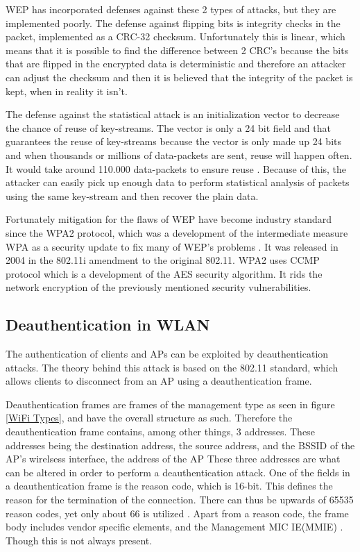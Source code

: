 WEP has incorporated defenses against these 2 types of attacks, but they are implemented poorly. The defense against flipping bits is integrity checks in the packet, implemented as a CRC-32 checksum. Unfortunately this is linear, which means that it is possible to find the difference between 2 CRC's because the bits that are flipped in the encrypted data is deterministic and therefore an attacker can adjust the checksum and then it is believed that the integrity of the packet is kept, when in reality it isn't.

The defense against the statistical attack is an initialization vector to decrease the chance of reuse of key-streams. The vector is only a 24 bit field and that guarantees the reuse of key-streams because the vector is only made up 24 bits and when thousands or millions of data-packets are sent, reuse will happen often. It would take around 110.000 data-packets to ensure reuse \cite{Random_map}. Because of this, the attacker can easily pick up enough data to perform statistical analysis of packets using the same key-stream and then recover the plain data.

Fortunately mitigation for the flaws of WEP have become industry standard since the WPA2 protocol, which was a development of the intermediate measure WPA as a security update to fix many of WEP's problems \cite{WPA2_1}\cite{WEP3}. It was released in 2004 in the 802.11i amendment to the original 802.11. WPA2 uses CCMP protocol which is a development of the AES security algorithm. It rids the network encryption of the previously mentioned security vulnerabilities. 

\subsection{Deauthentication in WLAN}
The authentication of clients and APs can be exploited by deauthentication attacks. The theory behind this attack is based on the 802.11 standard, which allows clients to disconnect from an AP using a deauthentication frame\cite{IEEE802.11}.

Deauthentication frames are frames of the management type as seen in figure \ref{WiFi Types}, and have the overall structure as such. Therefore the deauthentication frame contains, among other things, 3 addresses. These addresses being the destination address, the source address, and the BSSID of the AP's wirelsess interface, the address of the AP  These three addresses are what can be altered in order to perform a deauthentication attack. One of the fields in a deauthentication frame is the reason code, which is 16-bit. This defines the reason for the termination of the connection. There can thus be upwards of 65535 reason codes, yet only about 66 is utilized \cite{Cisco_Deathentication_reasoncodes}. Apart from a reason code, the frame body includes vendor specific elements, and the Management MIC IE(MMIE) \cite{IEEE_802.11w}. Though this is not always present. 

